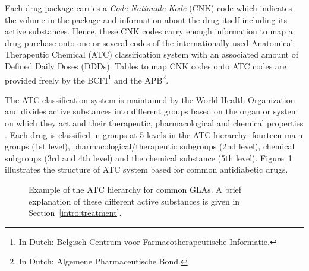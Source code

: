 Each drug package carries a \emph{Code Nationale Kode} (CNK) code which indicates the volume in the package and information about the drug itself including its active substances. Hence, these CNK codes carry enough information to map a drug purchase onto one or several codes of the internationally used Anatomical Therapeutic Chemical (ATC) classification system with an associated amount of Defined Daily Doses (DDDs). Tables to map CNK codes onto ATC codes are provided freely by the BCFI\footnote{In Dutch: Belgisch Centrum voor Farmacotherapeutische Informatie.} and the APB\footnote{In Dutch: Algemene Pharmaceutische Bond.}.

The ATC classification system is maintained by the World Health Organization and divides active substances into different groups based on the organ or system on which they act and their therapeutic, pharmacological and chemical properties \citep{world1996guidelines}. Each drug is classified in groups at 5 levels in the ATC hierarchy: fourteen main groups (1st level), pharmacological/therapeutic subgroups (2nd level), chemical subgroups (3rd and 4th level) and the chemical substance (5th level). Figure~\ref{intro:atc-example} illustrates the structure of ATC system based for common antidiabetic drugs.

\begin{figure}[!h]
\caption{Example of the ATC hierarchy for common GLAs. A brief explanation of these different active substances is given in Section~\ref{intro:treatment}.} \label{intro:atc-example}
\end{figure}



